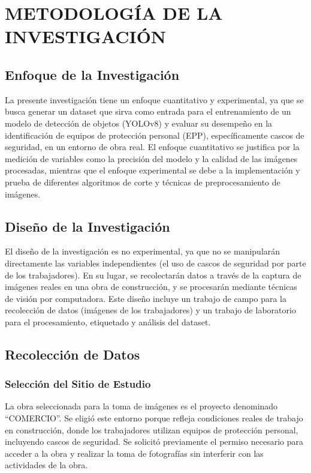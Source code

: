 \chapter{METODOLOGÍA DE LA INVESTIGACIÓN}

\section{Enfoque de la Investigación}

La presente investigación tiene un enfoque cuantitativo y experimental, ya que se busca generar un dataset que sirva como entrada para el entrenamiento de un modelo de detección de objetos (YOLOv8) y evaluar su desempeño en la identificación de equipos de protección personal (EPP), específicamente cascos de seguridad, en un entorno de obra real. El enfoque cuantitativo se justifica por la medición de variables como la precisión del modelo y la calidad de las imágenes procesadas, mientras que el enfoque experimental se debe a la implementación y prueba de diferentes algoritmos de corte y técnicas de preprocesamiento de imágenes.

\section{Diseño de la Investigación}

El diseño de la investigación es no experimental, ya que no se manipularán directamente las variables independientes (el uso de cascos de seguridad por parte de los trabajadores). En su lugar, se recolectarán datos a través de la captura de imágenes reales en una obra de construcción, y se procesarán mediante técnicas de visión por computadora. Este diseño incluye un trabajo de campo para la recolección de datos (imágenes de los trabajadores) y un trabajo de laboratorio para el procesamiento, etiquetado y análisis del dataset.

\section{Recolección de Datos}

\subsection{Selección del Sitio de Estudio}

La obra seleccionada para la toma de imágenes es el proyecto denominado ``COMERCIO''. Se eligió este entorno porque refleja condiciones reales de trabajo en construcción, donde los trabajadores utilizan equipos de protección personal, incluyendo cascos de seguridad. Se solicitó previamente el permiso necesario para acceder a la obra y realizar la toma de fotografías sin interferir con las actividades de la obra.

